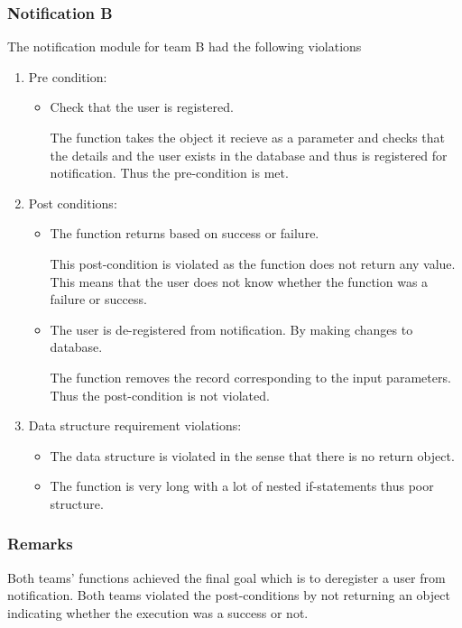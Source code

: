 \subsubsection*{Notification B}
The notification module for team B had the following violations
\begin{enumerate}
	\item Pre condition:
	\begin{itemize}
		\item Check that the user is registered.
		
		 The function takes the object it recieve as a parameter and checks that the details and the user exists in the database and thus is  registered for notification. Thus the pre-condition is met.
 
	\end{itemize}
	\item Post conditions:
		\begin{itemize}
			\item The function returns based on success or failure.
			
			This post-condition is violated as the function does not return any value. This means that the user does not know whether the function was a failure or success.
			
			\item The user is de-registered from notification. By making changes to database.
			
			The function removes the record corresponding to the input parameters. Thus the post-condition is not violated.	
			
			
		\end{itemize}
	\item Data structure requirement violations:
	\begin{itemize}
		\item The data structure is violated in the sense that there is no return object.
		\item The function is very long with a lot of nested if-statements thus poor structure.  
	\end{itemize}
\end{enumerate}
\subsubsection*{Remarks}
Both teams' functions achieved the final goal which is to deregister a user from notification. Both teams violated the post-conditions by not returning an object indicating whether the execution was a success or not.
